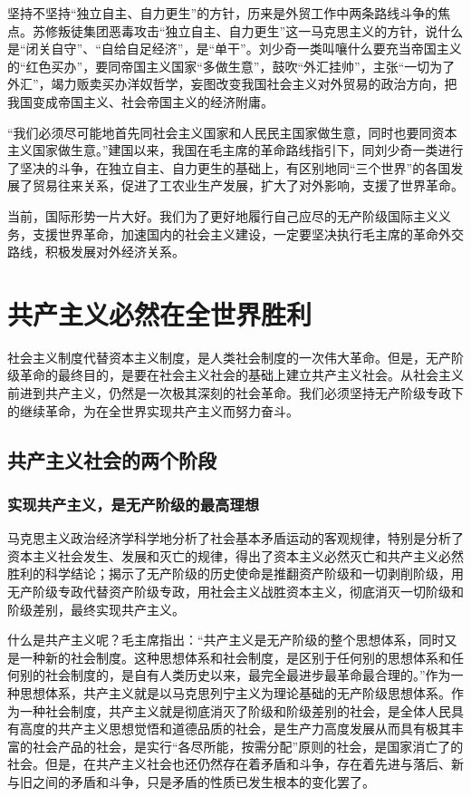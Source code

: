 \documentclass{book}
\begin{document}
坚持不坚持“独立自主、自力更生”的方针，历来是外贸工作中两条路线斗争的焦点。苏修叛徒集团恶毒攻击“独立自主、自力更生”这一马克思主义的方针，说什么是“闭关自守”、“自给自足经济”，是“单干”。刘少奇一类叫嚷什么要充当帝国主义的“红色买办”，要同帝国主义国家“多做生意”，鼓吹“外汇挂帅”，主张“一切为了外汇”，竭力贩卖买办洋奴哲学，妄图改变我国社会主义对外贸易的政治方向，把我国变成帝国主义、社会帝国主义的经济附庸。

“我们必须尽可能地首先同社会主义国家和人民民主国家做生意，同时也要同资本主义国家做生意。”建国以来，我国在毛主席的革命路线指引下，同刘少奇一类进行了坚决的斗争，在独立自主、自力更生的基础上，有区别地同“三个世界”的各国发展了贸易往来关系，促进了工农业生产发展，扩大了对外影响，支援了世界革命。

当前，国际形势一片大好。我们为了更好地履行自己应尽的无产阶级国际主义义务，支援世界革命，加速国内的社会主义建设，一定要坚决执行毛主席的革命外交路线，积极发展对外经济关系。

\chapter{共产主义必然在全世界胜利}

社会主义制度代替资本主义制度，是人类社会制度的一次伟大革命。但是，无产阶级革命的最终目的，是要在社会主义社会的基础上建立共产主义社会。从社会主义前进到共产主义，仍然是一次极其深刻的社会革命。我们必须坚持无产阶级专政下的继续革命，为在全世界实现共产主义而努力奋斗。

\section{共产主义社会的两个阶段}

\subsection{实现共产主义，是无产阶级的最高理想}

马克思主义政治经济学科学地分析了社会基本矛盾运动的客观规律，特别是分析了资本主义社会发生、发展和灭亡的规律，得出了资本主义必然灭亡和共产主义必然胜利的科学结论；揭示了无产阶级的历史使命是推翻资产阶级和一切剥削阶级，用无产阶级专政代替资产阶级专政，用社会主义战胜资本主义，彻底消灭一切阶级和阶级差别，最终实现共产主义。

什么是共产主义呢？毛主席指出：“共产主义是无产阶级的整个思想体系，同时又是一种新的社会制度。这种思想体系和社会制度，是区别于任何别的思想体系和任何别的社会制度的，是自有人类历史以来，最完全最进步最革命最合理的。”作为一种思想体系，共产主义就是以马克思列宁主义为理论基础的无产阶级思想体系。作为一种社会制度，共产主义就是彻底消灭了阶级和阶级差别的社会，是全体人民具有高度的共产主义思想觉悟和道德品质的社会，是生产力高度发展从而具有极其丰富的社会产品的社会，是实行“各尽所能，按需分配”原则的社会，是国家消亡了的社会。但是，在共产主义社会也还仍然存在着矛盾和斗争，存在着先进与落后、新与旧之间的矛盾和斗争，只是矛盾的性质已发生根本的变化罢了。
\end{document}
